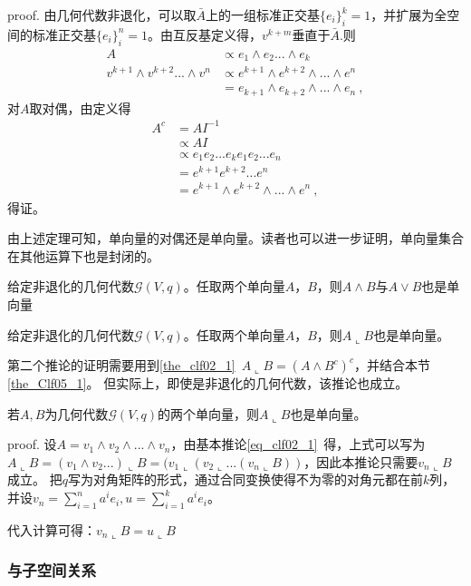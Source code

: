 proof.
由几何代数非退化，可以取$\bar A$上的一组标准正交基$\{e_i\}^k_i=1$，并扩展为全空间的标准正交基$\{e_i\}^n_i=1$。由互反基定义得，$v^{k+m}$垂直于$\bar A$.则
\begin{equation}
\begin{aligned}
A&\propto e_1\wedge e_2...\wedge e_k\\
v^{k+1}\wedge v^{k+2}...\wedge v^n&\propto e^{k+1}\wedge e^{k+2}\wedge...\wedge e^n\\
&=e_{k+1}\wedge e_{k+2}\wedge...\wedge e_n~,
\end{aligned}
\end{equation}
对$A$取对偶，由定义得
\begin{equation}
\begin{aligned}
A^c&=AI^{-1}\\
&\propto AI\\
&\propto e_1 e_2... e_k e_1 e_2... e_n\\
&=e^{k+1} e^{k+2}... e^n\\
&=e^{k+1}\wedge e^{k+2}\wedge...\wedge e^n~,
\end{aligned}
\end{equation}
得证。

由上述定理可知，单向量的对偶还是单向量。读者也可以进一步证明，单向量集合在其他运算下也是封闭的。
\begin{corollary}{}
给定非退化的几何代数$\mathcal G(V,q)$。任取两个单向量$A$，$B$，则$A\wedge B$与$A\vee B$也是单向量
\end{corollary}
\begin{corollary}{}
给定非退化的几何代数$\mathcal G(V,q)$。任取两个单向量$A$，$B$，则$A\llcorner B$也是单向量。
\end{corollary}
第二个推论的证明需要用到\autoref{the_clf02_1}~$A\llcorner B=(A\wedge B^c)^c$，并结合本节\autoref{the_Clf05_1}。
但实际上，即使是非退化的几何代数，该推论也成立。
\begin{corollary}{}
若$A,B$为几何代数$\mathcal G(V,q)$的两个单向量，则$A\llcorner B$也是单向量。
\end{corollary}
proof.
设$A=v_1\wedge v_2\wedge...\wedge v_n$，由基本推论\autoref{eq_clf02_1}~得，上式可以写为$A\llcorner B=(v_1\wedge v_2...)\llcorner B=(v_1\llcorner (v_2\llcorner...(v_n\llcorner B))$，因此本推论只需要$v_n\llcorner B$成立。
把$q$写为对角矩阵的形式，通过合同变换使得不为零的对角元都在前$k$列，并设$v_n=\sum \limits^{n}_{i=1}a^i e_i,u=\sum \limits^{k}_{i=1}a^i e_i$。

代入计算可得：$v_n\llcorner B=u\llcorner B$



\subsubsection{与子空间关系}